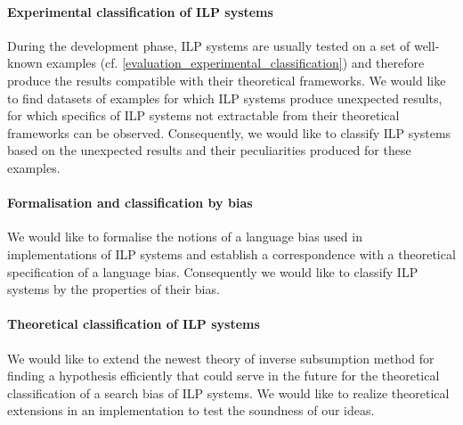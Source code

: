 \paragraph{Experimental classification of ILP systems}
During the development phase, ILP systems are usually tested on a set of well-known examples (cf. \ref{evaluation_experimental_classification}) and therefore produce the results compatible with their theoretical frameworks.
We would like to find datasets of examples for which ILP systems produce
unexpected results, for which specifics of ILP systems not extractable from their theoretical frameworks can be observed. Consequently, we would like to classify ILP systems based on the unexpected results and their peculiarities produced for these examples.
\paragraph{Formalisation and classification by bias}
We would like to formalise the notions of a language bias used in implementations of ILP systems and establish a correspondence with a theoretical specification of a language bias. Consequently we would like to classify ILP systems by the properties of their bias.
\paragraph{Theoretical classification of ILP systems}
We would like to extend the newest theory of inverse subsumption method for finding a hypothesis efficiently that could serve in the future for the theoretical classification of a search bias of ILP systems. We would like to realize theoretical extensions in an implementation to test the soundness of our ideas.

